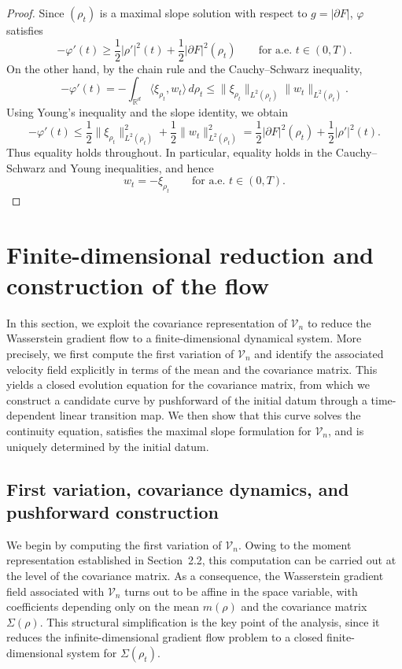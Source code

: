 \documentclass[11pt,reqno]{amsart}
\numberwithin{figure}{section}
\begin{document}
\begin{proof}
	Since $(\rho_t)$ is a maximal slope solution with respect to
	$g=|\partial F|$, $\varphi$ satisfies
	\[
	-\varphi'(t)
	\ge
	\frac12|\rho'|^2(t)+\frac12|\partial F|^2(\rho_t)
	\qquad\text{for a.e. }t\in(0,T).
	\]
	On the other hand, by the chain rule and the Cauchy--Schwarz inequality,
	\[
	-\varphi'(t)
	=
	-\int_{\mathbb R^d}
	\langle \xi_{\rho_t},w_t\rangle\,d\rho_t
	\le
	\|\xi_{\rho_t}\|_{L^2(\rho_t)}\|w_t\|_{L^2(\rho_t)}.
	\]
	Using Young's inequality and the slope identity, we obtain
	\[
	-\varphi'(t)
	\le
	\frac12\|\xi_{\rho_t}\|_{L^2(\rho_t)}^2
	+
	\frac12\|w_t\|_{L^2(\rho_t)}^2
	=
	\frac12|\partial F|^2(\rho_t)
	+
	\frac12|\rho'|^2(t).
	\]
	Thus equality holds throughout. In particular, equality holds in the
	Cauchy--Schwarz and Young inequalities, and hence
	\[
	w_t=-\xi_{\rho_t}
	\qquad\text{for a.e. }t\in(0,T).
	\]
\end{proof}





\section{Finite-dimensional reduction and construction of the flow}\label{sec:3}
\setcounter{equation}{0}


In this section, we exploit the covariance representation of $\mathcal V_n$ to reduce the Wasserstein gradient flow to a finite-dimensional dynamical system. More precisely, we first compute the first variation of $\mathcal V_n$ and identify the associated velocity field explicitly in terms of the mean and the covariance matrix. This yields a closed evolution equation for the covariance matrix, from which we construct a candidate curve by pushforward of the initial datum through a time-dependent linear transition map. We then show that this curve solves the continuity equation, satisfies the maximal slope formulation for $\mathcal V_n$, and is uniquely determined by the initial datum.


\subsection{First variation, covariance dynamics, and pushforward construction}\label{sec:3.1}

We begin by computing the first variation of $\mathcal V_n$. Owing to the moment representation established in Section~2.2, this computation can be carried out at the level of the covariance matrix. As a consequence, the Wasserstein gradient field associated with $\mathcal V_n$ turns out to be affine in the space variable, with coefficients depending only on the mean $m(\rho)$ and the covariance matrix $\Sigma(\rho)$. This structural simplification is the key point of the analysis, since it reduces the infinite-dimensional gradient flow problem to a closed finite-dimensional system for $\Sigma(\rho_t)$.
\end{document}
